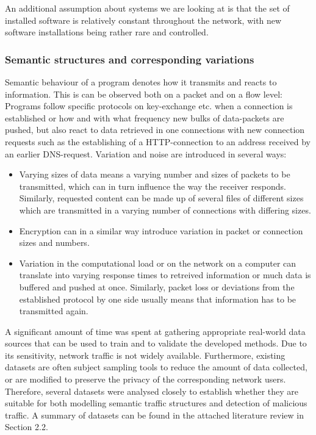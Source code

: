 \documentclass[a4paper,12pt,twoside]{report}
\begin{document}
An additional assumption about systems we are looking at is that the set of installed software is relatively constant throughout the network, with new software installations being rather rare and controlled. 

\subsubsection{Semantic structures and corresponding variations}

Semantic behaviour of a program denotes how it transmits and reacts to information. This is can be observed both on a packet and on a flow level: Programs follow specific protocols on key-exchange etc. when a connection is established or how and with what frequency new bulks of data-packets are pushed, but also react to data retrieved in one connections with new connection requests such as the establishing of a HTTP-connection to an address received by an earlier DNS-request. Variation and noise are introduced in several ways:

\begin{itemize}

\item Varying sizes of data means a varying number and sizes of packets to be transmitted, which can in turn influence the way the receiver responds. Similarly, requested content can be made up of several files of different sizes which are transmitted in a varying number of connections with differing sizes.
\item Encryption can in a similar way introduce variation in packet or connection sizes and numbers.
\item Variation in the computational load or on the network on a computer can translate into varying response times to retreived information or much data is buffered and pushed at once. Similarly, packet loss or deviations from the established protocol by one side usually means that information has to be transmitted again.

\end{itemize}

A significant amount of time was spent at gathering appropriate  real-world data sources that can be used to train and to validate the developed methods. Due to its sensitivity, network traffic is not widely available. Furthermore, existing datasets are often subject sampling tools to reduce the amount of data collected, or are modified to preserve the privacy of the corresponding network users. Therefore, several datasets were analysed closely to establish whether they are suitable for both modelling semantic traffic structures and detection of malicious traffic. A summary of datasets can be found in the attached literature review in Section 2.2.
\end{document}
